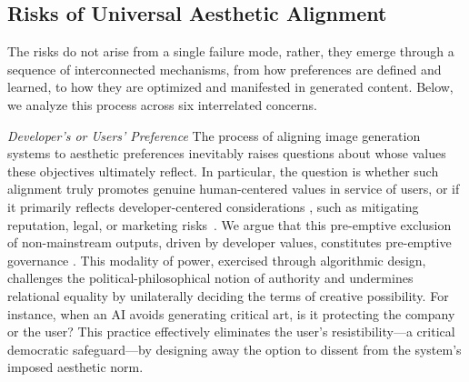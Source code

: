 \subsection{Risks of Universal Aesthetic Alignment}
The risks do not arise from a single failure mode, rather, they emerge through a sequence of interconnected mechanisms, from how preferences are defined and learned, to how they are optimized and manifested in generated content. Below, we analyze this process across six interrelated concerns.

 
\textit{Developer's or Users' Preference} 
The process of aligning image generation systems to aesthetic preferences inevitably raises questions about whose values these objectives ultimately reflect. In particular, the question is whether such alignment truly promotes genuine human-centered values in service of users, or if it primarily reflects developer-centered considerations \cite{naseh_r1dacted_2025}, such as mitigating reputation, legal, or marketing risks~\cite{guo_position_2025}. We argue that this pre-emptive exclusion of non-mainstream outputs, driven by developer values, constitutes pre-emptive governance \cite{lazar_governing_2025}. This modality of power, exercised through algorithmic design, challenges the political-philosophical notion of authority and undermines relational equality by unilaterally deciding the terms of creative possibility. For instance, when an AI avoids generating critical art, is it protecting the company or the user? This practice effectively eliminates the user's resistibility—a critical democratic safeguard—by designing away the option to dissent from the system's imposed aesthetic norm.


